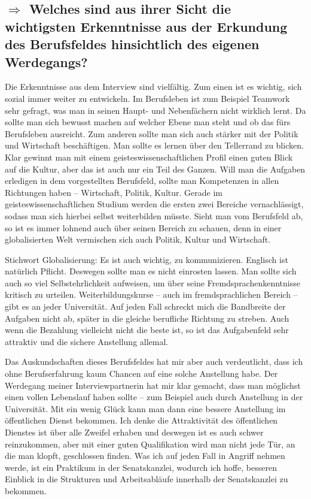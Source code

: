 \documentclass{../../sem_paper}
\newcommand\quest[1]{\subsection*{$\Rightarrow$ #1}}
\begin{document}
\quest{Welches sind aus ihrer Sicht die wichtigsten Erkenntnisse aus der Erkundung des Berufsfeldes hinsichtlich des eigenen Werdegangs?}
Die Erkenntnisse aus dem Interview sind vielfältig. Zum einen ist es wichtig, sich sozial immer weiter zu entwickeln. Im Berufsleben ist zum Beispiel Teamwork sehr gefragt, was man in seinen Haupt- und Nebenfächern nicht wirklich lernt. Da sollte man sich bewusst machen auf welcher Ebene man steht und ob das fürs Berufsleben ausreicht.
Zum anderen sollte man sich auch stärker mit der Politik und Wirtschaft beschäftigen. Man sollte es lernen über den Tellerrand zu blicken. Klar gewinnt man mit einem geisteswissenschaftlichen Profil einen guten Blick auf die Kultur, aber das ist auch nur ein Teil des Ganzen. Will man die Aufgaben erledigen in dem  vorgestellten Berufsfeld, sollte man Kompetenzen in allen Richtungen haben -- Wirtschaft, Politik, Kultur. Gerade im geisteswissenschaftlichen Studium werden die ersten zwei Bereiche vernachlässigt, sodass man sich hierbei selbst weiterbilden müsste. Sieht man vom Berufsfeld ab, so ist es immer lohnend auch über seinen Bereich zu schauen, denn in einer globalisierten Welt vermischen sich auch Politik, Kultur und Wirtschaft. 

Stichwort Globalisierung: Es ist auch wichtig, zu kommunizieren. Englisch ist natürlich Pflicht. Deswegen sollte man es nicht einrosten lassen. Man sollte sich auch so viel Selbstehrlichkeit aufweisen, um über seine Fremdsprachenkenntnisse kritisch zu urteilen. Weiterbildungskurse -- auch im fremdsprachlichen Bereich -- gibt es an jeder Universität.
Auf jeden Fall schreckt mich die Bandbreite der Aufgaben nicht ab, später in die gleiche berufliche Richtung zu streben. Auch wenn die Bezahlung vielleicht nicht die beste ist, so ist das Aufgabenfeld sehr attraktiv und die sichere Anstellung allemal. 

Das Auskundschaften dieses Berufsfeldes hat mir aber auch verdeutlicht, dass ich ohne Berufserfahrung kaum Chancen auf eine solche Anstellung habe. Der Werdegang meiner Interviewpartnerin hat mir klar gemacht, dass man möglichst einen vollen Lebenslauf haben sollte -- zum Beispiel auch durch Anstellung in der Universität. Mit ein wenig Glück kann man dann eine bessere Anstellung im öffentlichen Dienst bekommen.
Ich denke die Attraktivität des öffentlichen Dienstes ist über alle Zweifel erhaben und deswegen ist es auch schwer reinzukommen, aber mit einer guten Qualifikation wird man nicht jede Tür, an die man klopft, geschlossen finden. 
Was ich auf jeden Fall in Angriff nehmen werde, ist ein Praktikum in der Senatskanzlei, wodurch ich hoffe, besseren Einblick in die Strukturen und Arbeitsabläufe innerhalb der Senatskanzlei zu bekommen.
\end{document}
